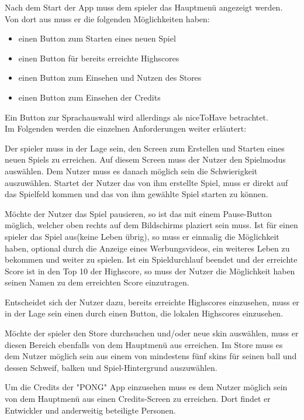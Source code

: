 Nach dem Start der App muss dem \gls{spieler} das Hauptmenü angezeigt werden.
Von dort aus muss er die folgenden Möglichkeiten haben:
\begin{itemize}
    \item einen Button zum Starten eines neuen Spiel
    \item einen Button für bereits erreichte Highscores
    \item einen Button zum Einsehen und Nutzen des Stores
    \item einen Button zum Einsehen der Credits
\end{itemize}

Ein Button zur Sprachauswahl wird allerdings als \gls{niceToHave} betrachtet.
\\
Im Folgenden werden die einzelnen Anforderungen weiter erläutert:

Der \gls{spieler} muss in der Lage sein, den Screen zum Erstellen und Starten eines neuen Spiels zu erreichen. Auf diesem
Screen muss der Nutzer den Spielmodus auswählen. Dem Nutzer muss es danach möglich sein die Schwierigkeit auszuwählen.
Startet der Nutzer das von ihm erstellte Spiel, muss er direkt auf das Spielfeld kommen und das von ihm gewählte Spiel starten zu können.

Möchte der Nutzer das Spiel pausieren, so ist das mit einem Pause-Button möglich, welcher oben rechts auf dem Bildschirms plaziert sein muss.
Ist für einen \gls{spieler} das Spiel aus(keine Leben übrig), so muss er einmalig die Möglichkeit haben, optional durch die Anzeige eines Werbungsvideos, ein weiteres Leben zu bekommen und weiter zu spielen.
Ist ein Spieldurchlauf beendet und der erreichte Score ist in den Top 10 der Highscore, so muss der Nutzer die Möglichkeit haben seinen Namen zu dem erreichten Score einzutragen.

Entscheidet sich der Nutzer dazu, bereits erreichte Highscores einzusehen, muss er in der Lage sein einen durch einen Button, die lokalen Highscores einzusehen.

Möchte der \gls{spieler} den Store durchsuchen und/oder neue skin auswählen, muss er diesen Bereich ebenfalls von dem Hauptmenü aus erreichen. 
Im Store muss es dem Nutzer möglich sein aus einem von mindestens fünf skins für seinen ball und dessen Schweif, balken und Spiel-Hintergrund auszuwählen.

Um die Credits der "PONG" App einzusehen muss es dem Nutzer möglich sein von dem Hauptmenü aus einen Credits-Screen zu erreichen. Dort findet er Entwickler und anderweitig beteiligte Personen.

